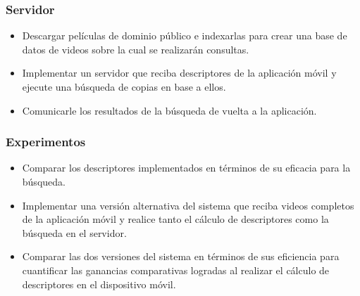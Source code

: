 \subsubsection*{Servidor}
\begin{itemize}
\item Descargar películas de dominio público e indexarlas para crear una base de datos de videos sobre la cual se realizarán consultas.
\item Implementar un servidor que reciba descriptores de la aplicación móvil y ejecute una búsqueda de copias en base a ellos.
\item Comunicarle los resultados de la búsqueda de vuelta a la aplicación.
\end{itemize}
\subsubsection*{Experimentos}
\begin{itemize}
\item Comparar los descriptores implementados en términos de su eficacia para la búsqueda.
\item Implementar una versión alternativa del sistema que reciba videos completos de la aplicación móvil y realice tanto el cálculo de descriptores como la búsqueda en el servidor.
\item Comparar las dos versiones del sistema en términos de sus eficiencia para cuantificar las ganancias comparativas logradas al realizar el cálculo de descriptores en el dispositivo móvil. 
\end{itemize}

